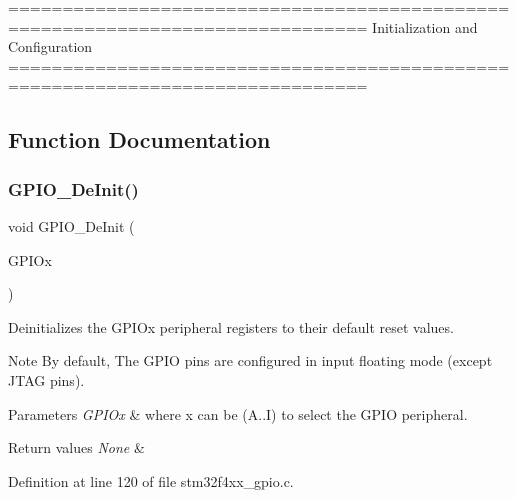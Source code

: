 \begin{DoxyVerb} ===============================================================================
                        Initialization and Configuration
 ===============================================================================  \end{DoxyVerb}
 

\subsection{Function Documentation}
\mbox{\label{group___g_p_i_o___group1_gaa60bdf3182c44b5fa818f237042f52ee}} 
\subsubsection{\texorpdfstring{G\+P\+I\+O\+\_\+\+De\+Init()}{GPIO\_DeInit()}}
{\footnotesize\ttfamily void G\+P\+I\+O\+\_\+\+De\+Init (\begin{DoxyParamCaption}\item[{\hyperlink{struct_g_p_i_o___type_def}{G\+P\+I\+O\+\_\+\+Type\+Def} $\ast$}]{G\+P\+I\+Ox }\end{DoxyParamCaption})}



Deinitializes the G\+P\+I\+Ox peripheral registers to their default reset values. 

\begin{DoxyNote}{Note}
By default, The G\+P\+IO pins are configured in input floating mode (except J\+T\+AG pins). 
\end{DoxyNote}

\begin{DoxyParams}{Parameters}
{\em G\+P\+I\+Ox} & where x can be (A..I) to select the G\+P\+IO peripheral. \\
\hline
\end{DoxyParams}

\begin{DoxyRetVals}{Return values}
{\em None} & \\
\hline
\end{DoxyRetVals}


Definition at line 120 of file stm32f4xx\+\_\+gpio.\+c.

